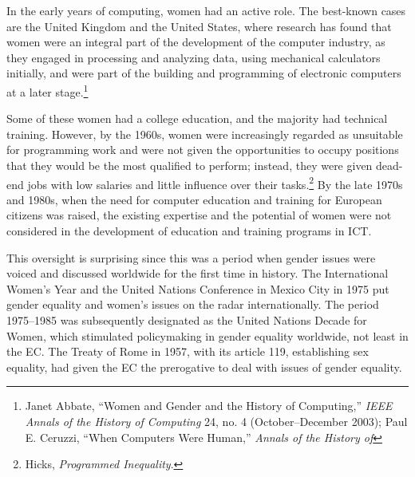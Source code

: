 \documentclass{tufte-handout}
\begin{document}
In the early years of computing, women had an active role. The
best-known cases are the United Kingdom and the United States, where
research has found that women were an integral part of the development
of the computer industry, as they engaged in processing and analyzing
data, using mechanical calculators initially, and were part of the
building and programming of electronic computers at a later stage.\footnote{Janet Abbate, ``Women and Gender and the History of
  Computing,'' \emph{IEEE Annals of the History of Computing} 24, no. 4
  (October--December 2003); Paul E. Ceruzzi, ``When Computers Were
  Human,'' \emph{Annals of the History of}}

Some of these women had a college education, and the majority had
technical training. However, by the 1960s, women were increasingly
regarded as unsuitable for programming work and were not given the
opportunities to occupy positions that they would be the most qualified
to perform; instead, they were given dead-end jobs with low salaries and
little influence over their tasks.\footnote{Hicks, \emph{Programmed
  Inequality}.} By the late 1970s and 1980s, when the need for computer
education and training for European citizens was raised, the existing
expertise and the potential of women were not considered in the
development of education and training programs in ICT.

This oversight is surprising since this was a period when gender issues
were voiced and discussed worldwide for the first time in history. The
International Women's Year and the United Nations Conference in Mexico
City in 1975 put gender equality and women's issues on the radar
internationally. The period 1975--1985 was subsequently designated as
the United Nations Decade for Women, which stimulated policymaking in
gender equality worldwide, not least in the EC. The Treaty of Rome in
1957, with its article 119, establishing sex equality, had given the EC
the prerogative to deal with issues of gender equality.
\end{document}
